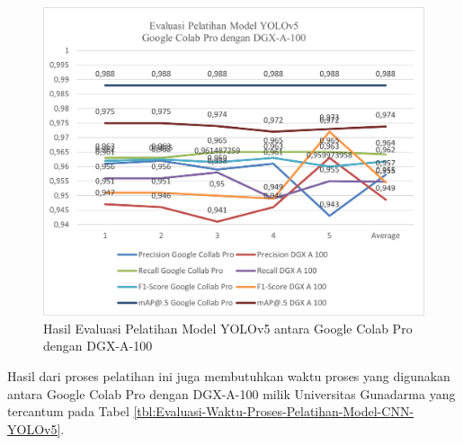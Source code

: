 \begin{figure}[H]
	\vspace{-0.1cm}
	\begin{center}
		\includegraphics[width=1\columnwidth]{bab4/Gambar/Picture25.png}
	\end{center}
	\vspace{-0.2cm}
	\captionsetup{justification=centering}
	\caption{Hasil Evaluasi Pelatihan Model YOLOv5 antara Google Colab Pro dengan DGX-A-100}\label{img:Hasil-Evaluasi-Pelatihan-Model-YOLOv5-Colab-DGX}
\end{figure}

Hasil dari proses pelatihan ini juga membutuhkan waktu proses yang digunakan antara Google Colab Pro dengan DGX-A-100 milik Universitas Gunadarma yang tercantum pada Tabel \ref{tbl:Evaluasi-Waktu-Proses-Pelatihan-Model-CNN-YOLOv5}.

